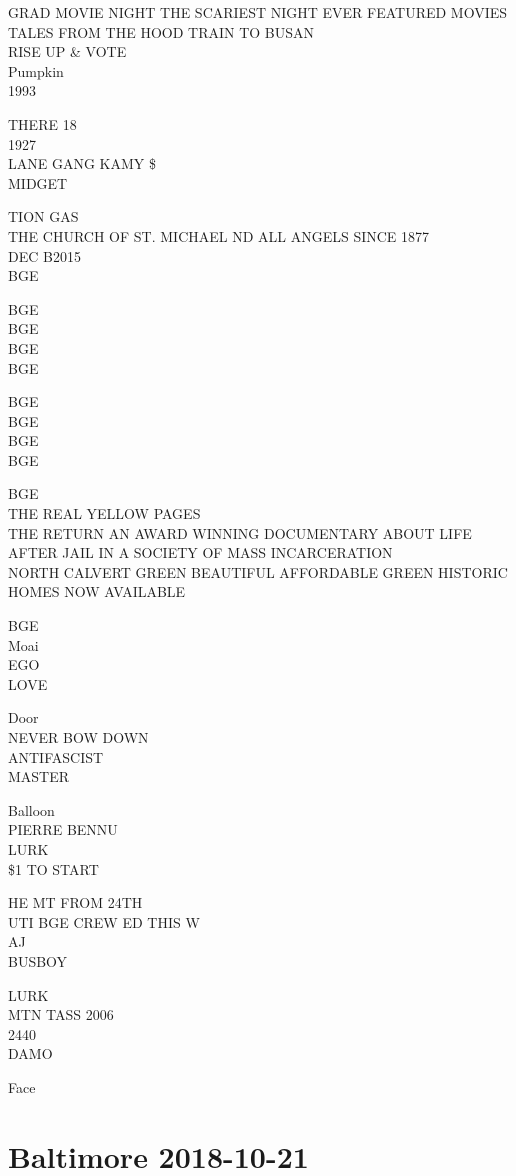 \documentclass[10pt,letterpaper]{article}
\begin{document}
GRAD MOVIE NIGHT THE SCARIEST NIGHT EVER FEATURED MOVIES TALES FROM THE HOOD TRAIN TO BUSAN\\
RISE UP \& VOTE\\
Pumpkin\\
1993

THERE 18\\
1927\\
LANE GANG KAMY \$\\
MIDGET

TION GAS\\
THE CHURCH OF ST. MICHAEL ND ALL ANGELS SINCE 1877\\
DEC B2015\\
BGE

BGE\\
BGE\\
BGE\\
BGE

BGE\\
BGE\\
BGE\\
BGE

BGE\\
THE REAL YELLOW PAGES\\
THE RETURN AN AWARD WINNING DOCUMENTARY ABOUT LIFE AFTER JAIL IN A SOCIETY OF MASS INCARCERATION\\
NORTH CALVERT GREEN BEAUTIFUL AFFORDABLE GREEN HISTORIC HOMES NOW AVAILABLE

BGE\\
Moai\\
EGO\\
LOVE

Door\\
NEVER BOW DOWN\\
ANTIFASCIST\\
MASTER

Balloon\\
PIERRE BENNU\\
LURK\\
\$1 TO START

HE MT FROM 24TH\\
UTI BGE CREW ED THIS W\\
AJ\\
BUSBOY

LURK\\
MTN TASS 2006\\
2440\\
DAMO

Face


\section*{Baltimore 2018-10-21}
\end{document}
